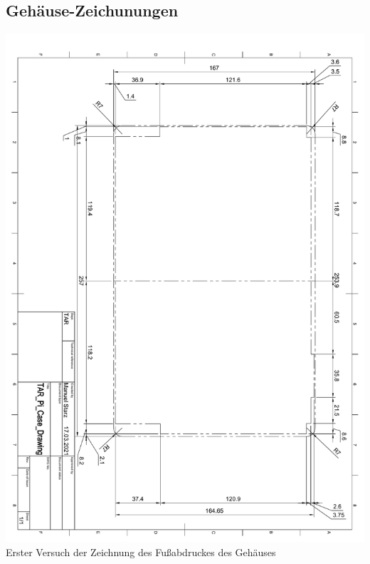 \subsection{Gehäuse-Zeichunungen}\label{ah_gehaeuse}
\includegraphics*[width=1\textwidth,page=1]{pdf/gehäuse_zeichnung_fußabdruck_v1.pdf}
\label{fig:case_footprint}
Erster Versuch der Zeichnung des Fußabdruckes des Gehäuses
\newpage
